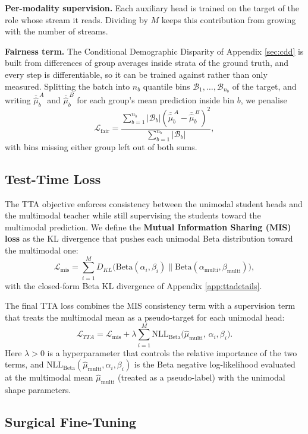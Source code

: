 \documentclass[10pt,a4paper,twocolumn]{article}
\begin{document}
	\textbf{Per-modality supervision.} Each auxiliary head is trained on the target of the role whose stream it reads. Dividing by $M$ keeps this contribution from growing with the number of streams.
	
	\textbf{Fairness term.} The Conditional Demographic Disparity of Appendix \ref{sec:cdd} is built from differences of group averages inside strata of the ground truth, and every step is differentiable, so it can be trained against rather than only measured. Splitting the batch into $n_b$ quantile bins $\mathcal{B}_1,\dots,\mathcal{B}_{n_b}$ of the target, and writing $\overline{\hat{\mu}}^{\,A}_b$ and $\overline{\hat{\mu}}^{\,B}_b$ for each group's mean prediction inside bin $b$, we penalise
	$$\mathcal{L}_{\text{fair}} = \frac{\sum_{b=1}^{n_b} |\mathcal{B}_b| \left(\overline{\hat{\mu}}^{\,A}_b - \overline{\hat{\mu}}^{\,B}_b\right)^{2}}{\sum_{b=1}^{n_b} |\mathcal{B}_b|},$$
	with bins missing either group left out of both sums.

	\subsection{Test-Time Loss}
	\label{sec:ttaloss}
	
	The TTA objective enforces consistency between the unimodal student heads and the multimodal teacher while still supervising the students toward the multimodal prediction. We define the \textbf{Mutual Information Sharing (MIS) loss} as the KL divergence that pushes each unimodal Beta distribution toward the multimodal one:
	$$
	\mathcal{L}_{\text{mis}} = \sum_{i=1}^M D_{KL} \bigl( \mathrm{Beta}(\alpha_i, \beta_i) \parallel \mathrm{Beta}(\alpha_{\text{multi}}, \beta_{\text{multi}}) \bigr),
	$$
	with the closed-form Beta KL divergence of Appendix \ref{app:ttadetails}.
	
	The final TTA loss combines the MIS consistency term with a supervision term that treats the multimodal mean as a pseudo-target for each unimodal head:
	$$
	\mathcal{L}_{TTA} = \mathcal{L}_{\text{mis}} + \lambda \sum_{i=1}^M \text{NLL}_{\text{Beta}}\bigl(\hat{\mu}_{\text{multi}},\, \alpha_i, \beta_i\bigr).
	$$
	Here $\lambda > 0$ is a hyperparameter that controls the relative importance of the two terms, and $\text{NLL}_{\text{Beta}}(\hat{\mu}_{\text{multi}}, \alpha_i, \beta_i)$ is the Beta negative log-likelihood evaluated at the multimodal mean $\hat{\mu}_{\text{multi}}$ (treated as a pseudo-label) with the unimodal shape parameters.
	
	\subsection{Surgical Fine-Tuning}
	\label{sec:surgical}
	
\end{document}
